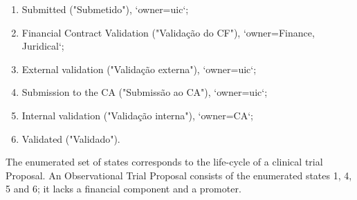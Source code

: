 \begin{enumerate}
    \item Submitted ("Submetido"), `owner=\acrshort{uic}`;
    \item Financial Contract Validation ("Validação do CF"), `owner=Finance, Juridical`;
    \item External validation ("Validação externa"), `owner=\acrshort{uic}`;
    \item Submission to the CA ("Submissão ao CA"), `owner=\acrshort{uic}`;
    \item Internal validation ("Validação interna"), `owner=CA`;
    \item Validated ("Validado").
\end{enumerate}

The enumerated set of states corresponds to the life-cycle of a clinical trial Proposal. An Observational Trial Proposal consists of the enumerated states 1, 4, 5 and 6; it lacks a financial component and a promoter.  

